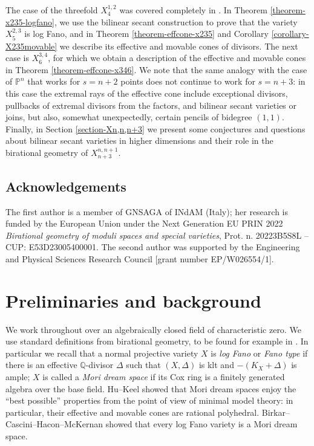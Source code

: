 \documentclass[a4paper,11pt]{article}
\newcommand{\PP}{\mathbb P}
\newcommand{\QQ}{\mathbb Q}
\begin{document}
The case of the threefold $X^{1,2}_4$ was covered completely in \cite{GPP21}. In Theorem \ref{theorem-x235-logfano}, we use the bilinear secant construction to prove that the variety $X^{2,3}_5$ is log Fano, and in Theorem \ref{theorem-effcone-x235} and Corollary \ref{corollary-X235movable} we describe its effective and movable cones of divisors. 
The next case is $X^{3,4}_6$, for which we obtain a description of the effective and movable cones in Theorem \ref{theorem-effcone-x346}. We note that the same analogy with the case of $\PP^n$ that works for $s=n+2$ points does not continue to work for $s=n+3$: in this case the extremal rays of the effective cone include exceptional divisors, pullbacks of extremal divisors from the factors, and bilinear secant varieties or joins, but also, somewhat unexpectedly, certain pencils of bidegree $(1,1)$. Finally, in Section \ref{section-Xn,n,n+3} we present some conjectures and questions about bilinear secant varieties in higher dimensions and their role in the birational geometry of $X^{n,n+1}_{n+3}$.

\subsection*{Acknowledgements}
The first author is a member of GNSAGA of INdAM (Italy); her research is funded by the European Union under the Next Generation EU PRIN 2022 \emph{Birational geometry of moduli spaces and special varieties}, Prot. n. 20223B5S8L --  CUP: E53D23005400001. The second author was supported by the Engineering and Physical Sciences Research Council [grant number EP/W026554/1].
\section{Preliminaries and background}\label{section-preliminaries}

We work throughout over an algebraically closed field of characteristic zero. We use standard definitions from birational geometry, to be found for example in \cite{KM98}. In particular we recall that a normal projective variety $X$ is {\it log Fano} or {\it Fano type} if there is an effective $\QQ$-divisor $\Delta$ such that $(X,\Delta)$ is klt and $-(K_X+\Delta)$ is ample; $X$ is called a {\it Mori dream space} if its Cox ring is a finitely generated algebra over the base field. Hu--Keel \cite{HK00} showed that Mori dream spaces enjoy the ``best possible'' properties from the point of view of minimal model theory: in particular, their effective and movable cones are rational polyhedral. Birkar--Cascini--Hacon--McKernan \cite{BCHM} showed that every log Fano variety is a Mori dream space. 
\end{document}
